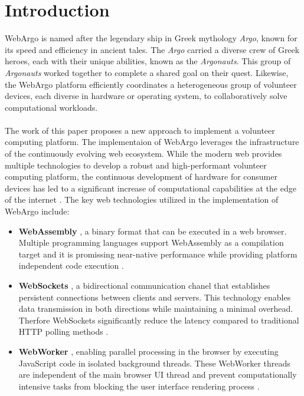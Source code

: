 \chapter{Introduction}
\label{ch:intro}
WebArgo is named after the legendary ship in Greek mythology \emph{Argo}, known for its speed and efficiency in ancient tales. The \emph{Argo} carried a diverse crew of Greek heroes, each with their unique abilities, known as the \emph{Argonauts}. This group of \emph{Argonauts} worked together to complete a shared goal on their quest. Likewise, the WebArgo platform efficiently coordinates a heterogeneous group of volunteer devices, each diverse in hardware or operating system, to collaboratively solve computational workloads.
\\~\\
The work of this paper proposes a new approach to implement a volunteer computing platform. The implementaion of WebArgo leverages the infrastructure of the continuously evolving web ecosystem. While the modern web provides multiple technologies to develop a robust and high-performant volunteer computing platform, the continuous development of hardware for consumer devices has led to a significant increase of computational capabilities at the edge of the internet \cite{relatedwork:mobilecloud, relatedwork:wasmedgecomputing}. The key web technologies utilized in the implementation of WebArgo include:
\begin{itemize}
    \item \textbf{WebAssembly} \cite{methodology:wasmW3C}, a binary format that can be executed in a web browser. Multiple programming languages support WebAssembly as a compilation target and it is promissing near-native performance while providing platform independent code execution \cite{methodology:wasm, methodology:wasmW3C}.
    \item \textbf{WebSockets} \cite{methodology:websockets1}, a bidirectional communication chanel that establishes persistent connections between clients and servers. This technology enables data transmission in both directions while maintaining a minimal overhead. Therfore WebSockets significantly reduce the latency compared to traditional \acs{HTTP} polling methods \cite{methodology:websockets3}. 
    \item \textbf{WebWorker} \cite{methodology:webworkers}, enabling parallel processing in the browser by executing JavaScript code in isolated background threads. These WebWorker threads are independent of the main browser UI thread and prevent computationally intensive tasks from blocking the user interface rendering process \cite{methodology:webworkers}.
\end{itemize}
